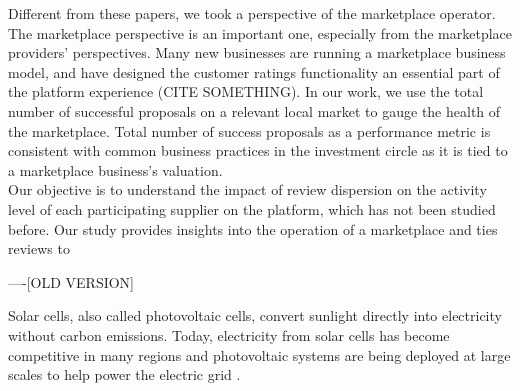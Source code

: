 \documentclass[msom,blindrev]{informs3}
\begin{document}
Different from these papers, we took a perspective of the marketplace operator. The marketplace perspective is an important one, especially from the marketplace providers' perspectives. Many new businesses are running a marketplace business model, and have designed the customer ratings functionality an essential part of the platform experience (CITE SOMETHING). In our work, we use the total number of successful proposals on a relevant local market to gauge the health of the marketplace. Total number of success proposals as a performance metric is consistent with common business practices in the investment circle \citep{boris_2018,galston_2017} as it is tied to a marketplace business's valuation. \\

Our objective is to understand the impact of review dispersion on the activity level of each participating supplier on the platform, which has not been studied before. Our study provides insights into the operation of a marketplace and ties reviews to


----[OLD VERSION]

Solar cells, also called photovoltaic cells, convert sunlight directly into electricity without carbon emissions. Today, electricity from solar cells has become competitive in many regions and photovoltaic systems are being deployed at large scales to help power the electric grid \citep{nrel.gov}.
\end{document}
